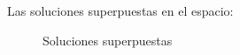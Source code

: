\documentclass[a4paper,12pt]{article}
\begin{document}
Las soluciones superpuestas en el espacio:
\begin{figure}[H]
    \centering
    \begin{adjustbox}{scale = 0.85, max width=\columnwidth}
    \end{adjustbox}
    \caption{Soluciones superpuestas}
\end{figure}





\end{document}
